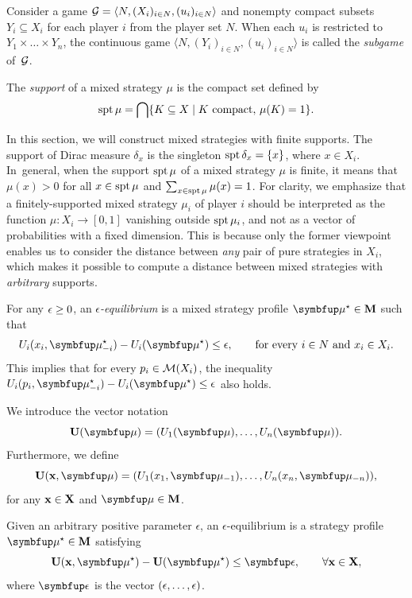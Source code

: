 Consider a game $\mathcal{G} = \langle N,(X_i)_{i\in N},(u_i)_{i\in N}\rangle$ and nonempty compact subsets $Y_i\subseteq X_i$ for each player $i$ from the player set $N$. When each $u_i$ is restricted to $Y_1\times\dots\times Y_n$, the continuous game $\langle N,(Y_i)_{i\in N},(u_i)_{i\in N}\rangle$ is called the \emph{subgame} of~$\mathcal{G}$.

The \emph{support} of a mixed strategy $\mu$ is the compact set defined by
\[
	\operatorname*{spt} \mu = \bigcap \{K\subseteq X\mid K \text{ compact},\, \mu(K)=1\}.
\]

In this section, we will construct mixed strategies with finite supports. The support of Dirac measure $\delta_x$ is the singleton $\operatorname*{spt} \delta_x=\{x\}$, where $x\in X_i$. In~general, when the support $\operatorname*{spt} \mu$ of a mixed strategy $\mu$ is finite, it means that $\mu(x)>0$ for all $x\in \operatorname*{spt} \mu$ and $\sum_{x\in \operatorname*{spt} \mu} \mu(x)=1$. For clarity, we emphasize that a finitely-supported mixed strategy $\mu_i$ of player $i$ should be interpreted as the function $\mu\colon X_i\to [0,1]$ vanishing outside $\operatorname*{spt} \mu_i$, and not as a vector of probabilities with a fixed dimension. This is because only the former viewpoint enables us to consider the distance between \emph{any} pair of pure strategies in $X_i$, which makes it possible to compute a distance between mixed strategies with \emph{arbitrary} supports.

For any $\epsilon\geq 0$, an \textit{$\epsilon$-equilibrium} is a mixed strategy profile $\bmu^\star\in \bM$ such that
\[
	U_i(x_i,\bmu_{-i}^\star) - U_i(\bmu^\star) \leq \eps, \qquad \text{for every $i\in N$ and $x_i\in X_i$.}
\]
This implies that for every $p_i\in \mathcal{M}(X_i)$, the inequality $U_i(p_i,\bmu_{-i}^\star) - U_i(\bmu^\star) \leq \eps$ also holds.

We introduce the vector notation
\[
	\bU(\bmu) = (U_1(\bmu), \dots, U_n(\bmu)).
\]
Furthermore, we define
\[
	\bU(\bx,\bmu) = (U_1(x_1,\bmu_{-1}), \dots, U_n(x_n,\bmu_{-n})),
\]
for any $\mathbf{x}\in\mathbf{X}$ and $\bmu\in \bM$.

\begin{definition}
	Given an arbitrary positive parameter $\epsilon$, an $\epsilon$-equilibrium is a strategy profile $\bmu^\star\in \bM$ satisfying
	\[
		\bU(\bx,\bmu^\star) - \bU(\bmu^\star) \leq \beps, \qquad \forall \bx\in\bX,
	\]
	where $\beps$ is the vector $(\epsilon, \dots, \epsilon)$.
\end{definition}
